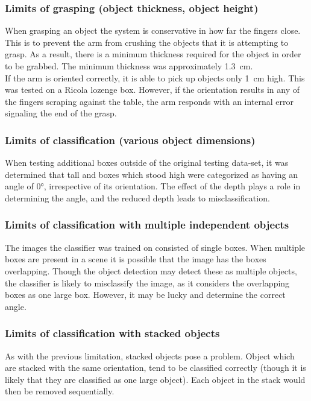 \documentclass[letterpaper, 10 pt, conference]{conf/ieeeconf}  %
\begin{document}
\subsubsection{Limits of grasping (object thickness, object height)}
When grasping an object the system is conservative in how far the fingers close.
This is to prevent the arm from crushing the objects that it is attempting to
grasp. As a result, there is a minimum thickness required for the object in
order to be grabbed. The minimum thickness was approximately
\SI{1.3}{\centi\meter}.\\

If the arm is oriented correctly, it is able to pick up objects only
\SI{1}{\centi\meter} high. This was tested on a Ricola lozenge box. However, if
the orientation results in any of the fingers scraping against the table, the
arm responds with an internal error signaling the end of the grasp.\\

\subsubsection{Limits of classification (various object dimensions)}
When testing additional boxes outside of the original testing data-set, it was
determined that tall and boxes which stood high were categorized as having an
angle of \ang{0}, irrespective of its orientation. The effect of the depth plays
a role in determining the angle, and the reduced depth leads to
misclassification.\\

\subsubsection{Limits of classification with multiple independent objects}
The images the classifier was trained on consisted of single boxes. When
multiple boxes are present in a scene it is possible that the image has the
boxes overlapping. Though the object detection may detect these as multiple
objects, the classifier is likely to misclassify the image, as it considers the
overlapping boxes as one large box. However, it may be lucky and determine the
correct angle.\\
\subsubsection{Limits of classification with stacked objects}
As with the previous limitation, stacked objects pose a problem. Object which
are stacked with the same orientation, tend to be classified correctly (though
it is likely that they are classified as one large object). Each object in the
stack would then be removed sequentially.\\
\end{document}
